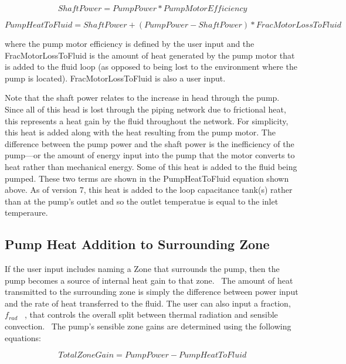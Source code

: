 \begin{equation}
ShaftPower = PumpPower * PumpMotorEfficiency
\end{equation}

\begin{equation}
PumpHeatToFluid = ShaftPower + \left( {PumpPower - ShaftPower} \right) * FracMotorLossToFluid
\end{equation}

where the pump motor efficiency is defined by the user input and the FracMotorLossToFluid is the amount of heat generated by the pump motor that is added to the fluid loop (as opposed to being lost to the environment where the pump is located). FracMotorLossToFluid is also a user input.

Note that the shaft power relates to the increase in head through the pump. Since all of this head is lost through the piping network due to frictional heat, this represents a heat gain by the fluid throughout the network. For simplicity, this heat is added along with the heat resulting from the pump motor. The difference between the pump power and the shaft power is the inefficiency of the pump---or the amount of energy input into the pump that the motor converts to heat rather than mechanical energy. Some of this heat is added to the fluid being pumped. These two terms are shown in the PumpHeatToFluid equation shown above. As of version 7, this heat is added to the loop capacitance tank(s) rather than at the pump's outlet and so the outlet temperatue is equal to the inlet temperaure.

\subsection{Pump Heat Addition to Surrounding Zone}\label{pump-heat-addition-to-surrounding-zone}

If the user input includes naming a Zone that surrounds the pump, then the pump becomes a source of internal heat gain to that zone.~ The amount of heat transmitted to the surrounding zone is simply the difference between power input and the rate of heat transferred to the fluid. The user can also input a fraction,\({f_{rad}}\) ~, that controls the overall split between thermal radiation and sensible convection.~ The pump's sensible zone gains are determined using the following equations:

\begin{equation}
TotalZoneGain = PumpPower - PumpHeatToFluid
\end{equation}

